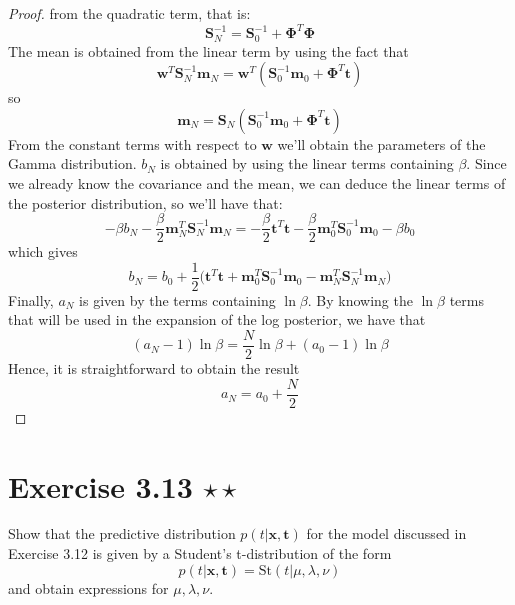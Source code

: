 \begin{proof}
    from the quadratic term, that is:
    \begin{equation}\label{eq:3.51*}\tag{3.51*}
         \mathbf{S}_N^{-1} = \mathbf{S}_0^{-1} + \mathbf{\Phi}^T\mathbf{\Phi}
    \end{equation}
    The mean is obtained from the linear term by using the fact that
    \[
        \mathbf{w}^T \mathbf{S}_N^{-1} \mathbf{m}_N
        = \mathbf{w}^T(\mathbf{S}_0^{-1} \mathbf{m}_0 + \mathbf{\Phi}^T \mathbf{t})
    \] 
    so 
    \begin{equation}\label{eq:3.50*}\tag{3.50*}
        \mathbf{m}_N = \mathbf{S}_N 
            (\mathbf{S}_0^{-1} \mathbf{m}_0 + \mathbf{\Phi}^T \mathbf{t})
    \end{equation}
    From the constant terms with respect to $\mathbf{w}$ we'll obtain the
    parameters of the Gamma distribution. $b_N$ is obtained by using the 
    linear terms containing  $\beta$. Since we already know the covariance and the 
    mean, we can deduce the linear terms of the posterior distribution, so we'll have
    that:
    \[
        - \beta b_N
        -\frac{\beta}{2} \mathbf{m}_N^T \mathbf{S}_N^{-1} \mathbf{m}_N
        = -\frac{\beta}{2} \mathbf{t}^T\mathbf{t} 
        -\frac{\beta}{2} \mathbf{m}_0^T \mathbf{S}_0^{-1} \mathbf{m}_0
        -\beta b_0
    \]
    which gives
    \begin{equation}\label{eq:3.12.1}\tag{3.12.1}
        b_N 
        = b_0 + \frac{1}{2} \big(
            \mathbf{t}^T\mathbf{t} + \mathbf{m}_0^T\mathbf{S}_0^{-1}\mathbf{m}_0
            - \mathbf{m}_N^T\mathbf{S}_N^{-1}\mathbf{m}_N\big)
    \end{equation}
    Finally, $a_N$ is given by the terms containing $\ln \beta$. 
    By knowing the $\ln \beta$ terms that will be used in the expansion of the 
    log posterior, we have that
    \[
        (a_N - 1) \ln \beta = \frac{N}{2} \ln \beta + (a_0 - 1) \ln \beta
    \] 
    Hence, it is straightforward to obtain the result
    \begin{equation}\label{eq:2.150}\tag{2.150}
        a_N = a_0 + \frac{N}{2}
    \end{equation}
\end{proof}

\section*{Exercise 3.13 $\star \star$}
Show that the predictive distribution $p(t | \mathbf{x}, \mathbf{t})$ for the 
model discussed in Exercise 3.12 is given by a Student's t-distribution of
the form
\begin{equation}\label{eq:3.114}\tag{3.114}
    p(t | \mathbf{x}, \mathbf{t}) = \text{St}(t | \mu, \lambda, \nu)
\end{equation}
and obtain expressions for $\mu, \lambda, \nu$.

